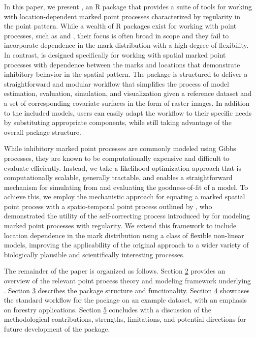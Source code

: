 In this paper, we present  \citep{drewLdmpprEstimateSimulate2025a}, an R package that provides a
suite of tools for working with location-dependent marked point
processes characterized by regularity in the point pattern. While a
wealth of R packages exist for working with point processes, such as
 \citep{baddeleySpatstatPackageAnalyzing2005} and
 \citep{hartePtProcessPackageModelling2010}, their focus
is often broad in scope and they fail to incorporate dependence in the
mark distribution with a high degree of flexibility. In contrast,
 is designed specifically for working with spatial marked
point processes with dependence between the marks and locations that
demonstrate inhibitory behavior in the spatial pattern. The package is
structured to deliver a straightforward and modular workflow that
simplifies the process of model estimation, evaluation, simulation, and
visualization given a reference dataset and a set of corresponding
covariate surfaces in the form of raster images. In addition to the
included models, users can easily adapt the workflow to their specific
needs by substituting appropriate components, while still taking
advantage of the overall package structure.

While inhibitory marked point processes are commonly modeled using Gibbs
processes, they are known to be computationally expensive and difficult
to evaluate efficiently. Instead, we take a likelihood optimization
approach that is computationally scalable, generally tractable, and
enables a straightforward mechanism for simulating from and evaluating
the goodness-of-fit of a model. To achieve this, we employ the
mechanistic approach for equating a marked spatial point process with a
spatio-temporal point process outlined by
\citet{mollerMechanisticSpatiotemporalPoint2016a}, who demonstrated the utility
of the self-correcting process introduced by
\citet{ishamSelfcorrectingPointProcess1979} for modeling marked point processes
with regularity. We extend this framework to include location dependence
in the mark distribution using a class of flexible non-linear models,
improving the applicability of the original approach to a wider variety
of biologically plausible and scientifically interesting processes.

The remainder of the paper is organized as follows. Section \hyperref[sec:background]{2} provides an overview of the relevant point process
theory and modeling framework underlying . Section \hyperref[sec:package]{3} describes the package structure and functionality.
Section \hyperref[sec:application]{4} showcases the standard workflow for the
package on an example dataset, with an emphasis on forestry
applications. Section \hyperref[sec:discussion]{5} concludes with a discussion
of the methodological contributions, strengths, limitations, and
potential directions for future development of the package.

